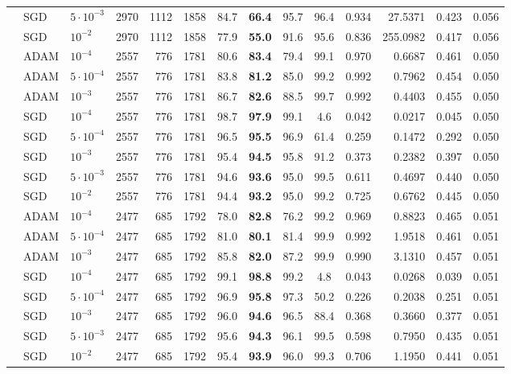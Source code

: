 \begin{landscape}
\begin{table}[p]
\begin{tabular}{lll|rrr|cccc|rrrr}
 & SGD & $5 \cdot 10^{-3}$ & 2970 & 1112 & 1858 & 84.7 & \textbf{66.4} & 95.7 & 96.4 & 0.934 & 27.5371 & 0.423 & 0.056 \\
 & SGD & $10^{-2}$ & 2970 & 1112 & 1858 & 77.9 & \textbf{55.0} & 91.6 & 95.6 & 0.836 & 255.0982 & 0.417 & 0.056 \\
\midrule
{} & ADAM & $10^{-4}$ & 2557 & 776 & 1781 & 80.6 & \textbf{83.4} & 79.4 & 99.1 & 0.970 & 0.6687 & 0.461 & 0.050 \\
 & ADAM & $5 \cdot 10^{-4}$ & 2557 & 776 & 1781 & 83.8 & \textbf{81.2} & 85.0 & 99.2 & 0.992 & 0.7962 & 0.454 & 0.050 \\
 & ADAM & $10^{-3}$ & 2557 & 776 & 1781 & 86.7 & \textbf{82.6} & 88.5 & 99.7 & 0.992 & 0.4403 & 0.455 & 0.050 \\
\cmidrule(lr){2-14}
 & SGD & $10^{-4}$ & 2557 & 776 & 1781 & 98.7 & \textbf{97.9} & 99.1 & 4.6 & 0.042 & 0.0217 & 0.045 & 0.050 \\
 & SGD & $5 \cdot 10^{-4}$ & 2557 & 776 & 1781 & 96.5 & \textbf{95.5} & 96.9 & 61.4 & 0.259 & 0.1472 & 0.292 & 0.050 \\
 & SGD & $10^{-3}$ & 2557 & 776 & 1781 & 95.4 & \textbf{94.5} & 95.8 & 91.2 & 0.373 & 0.2382 & 0.397 & 0.050 \\
 & SGD & $5 \cdot 10^{-3}$ & 2557 & 776 & 1781 & 94.6 & \textbf{93.6} & 95.0 & 99.5 & 0.611 & 0.4697 & 0.440 & 0.050 \\
 & SGD & $10^{-2}$ & 2557 & 776 & 1781 & 94.4 & \textbf{93.2} & 95.0 & 99.2 & 0.725 & 0.6762 & 0.445 & 0.050 \\
\midrule
{} & ADAM & $10^{-4}$ & 2477 & 685 & 1792 & 78.0 & \textbf{82.8} & 76.2 & 99.2 & 0.969 & 0.8823 & 0.465 & 0.051 \\
 & ADAM & $5 \cdot 10^{-4}$ & 2477 & 685 & 1792 & 81.0 & \textbf{80.1} & 81.4 & 99.9 & 0.992 & 1.9518 & 0.461 & 0.051 \\
 & ADAM & $10^{-3}$ & 2477 & 685 & 1792 & 85.8 & \textbf{82.0} & 87.2 & 99.9 & 0.990 & 3.1310 & 0.457 & 0.051 \\
\cmidrule(lr){2-14}
 & SGD & $10^{-4}$ & 2477 & 685 & 1792 & 99.1 & \textbf{98.8} & 99.2 & 4.8 & 0.043 & 0.0268 & 0.039 & 0.051 \\
 & SGD & $5 \cdot 10^{-4}$ & 2477 & 685 & 1792 & 96.9 & \textbf{95.8} & 97.3 & 50.2 & 0.226 & 0.2038 & 0.251 & 0.051 \\
 & SGD & $10^{-3}$ & 2477 & 685 & 1792 & 96.0 & \textbf{94.6} & 96.5 & 88.4 & 0.368 & 0.3660 & 0.377 & 0.051 \\
 & SGD & $5 \cdot 10^{-3}$ & 2477 & 685 & 1792 & 95.6 & \textbf{94.3} & 96.1 & 99.5 & 0.598 & 0.7950 & 0.435 & 0.051 \\
 & SGD & $10^{-2}$ & 2477 & 685 & 1792 & 95.4 & \textbf{93.9} & 96.0 & 99.3 & 0.706 & 1.1950 & 0.441 & 0.051 \\
\bottomrule
\end{tabular}
\end{table}
\end{landscape}